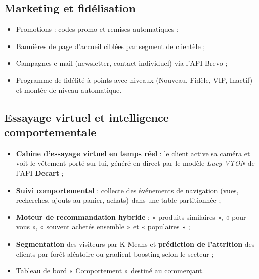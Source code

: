 \subsection{Marketing et fidélisation}
\begin{itemize}
    \item Promotions : codes promo et remises automatiques ;
    \item Bannières de page d'accueil ciblées par segment de clientèle ;
    \item Campagnes e-mail (newsletter, contact individuel) via l'API Brevo ;
    \item Programme de fidélité à points avec niveaux (Nouveau, Fidèle, VIP, Inactif) et montée de niveau automatique.
\end{itemize}

\subsection{Essayage virtuel et intelligence comportementale}
\begin{itemize}
    \item \textbf{Cabine d'essayage virtuel en temps réel} : le client active sa caméra et voit le vêtement porté sur lui, généré en direct par le modèle \textit{Lucy VTON} de l'API \textbf{Decart} ;
    \item \textbf{Suivi comportemental} : collecte des événements de navigation (vues, recherches, ajouts au panier, achats) dans une table partitionnée ;
    \item \textbf{Moteur de recommandation hybride} : « produits similaires », « pour vous », « souvent achetés ensemble » et « populaires » ;
    \item \textbf{Segmentation} des visiteurs par K-Means et \textbf{prédiction de l'attrition} des clients par forêt aléatoire ou gradient boosting selon le secteur ;
    \item Tableau de bord « Comportement » destiné au commerçant.
\end{itemize}

